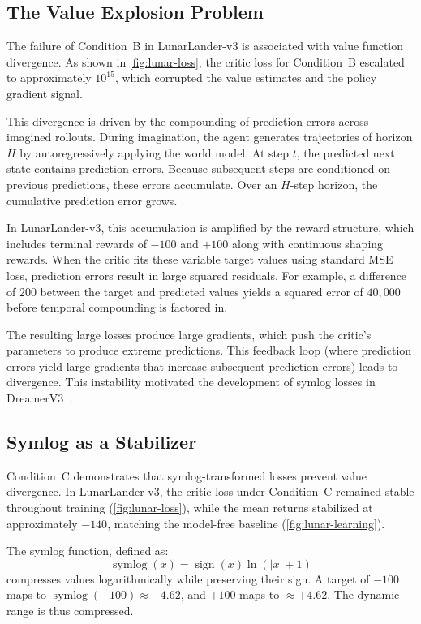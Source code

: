 \subsection{The Value Explosion Problem}

The failure of Condition~B in LunarLander-v3 is associated with value function divergence. As shown in \cref{fig:lunar-loss}, the critic loss for Condition~B escalated to approximately $10^{15}$, which corrupted the value estimates and the policy gradient signal.

This divergence is driven by the compounding of prediction errors across imagined rollouts. During imagination, the agent generates trajectories of horizon $H$ by autoregressively applying the world model. At step $t$, the predicted next state contains prediction errors. Because subsequent steps are conditioned on previous predictions, these errors accumulate. Over an $H$-step horizon, the cumulative prediction error grows.

In LunarLander-v3, this accumulation is amplified by the reward structure, which includes terminal rewards of $-100$ and $+100$ along with continuous shaping rewards. When the critic fits these variable target values using standard MSE loss, prediction errors result in large squared residuals. For example, a difference of $200$ between the target and predicted values yields a squared error of $40{,}000$ before temporal compounding is factored in.

The resulting large losses produce large gradients, which push the critic's parameters to produce extreme predictions. This feedback loop (where prediction errors yield large gradients that increase subsequent prediction errors) leads to divergence. This instability motivated the development of symlog losses in DreamerV3~\citep{hafner2023dreamerv3}.

\subsection{Symlog as a Stabilizer}

Condition~C demonstrates that symlog-transformed losses prevent value divergence. In LunarLander-v3, the critic loss under Condition~C remained stable throughout training (\cref{fig:lunar-loss}), while the mean returns stabilized at approximately $-140$, matching the model-free baseline (\cref{fig:lunar-learning}).

The symlog function, defined as:
\begin{equation}
    \operatorname{symlog}(x) = \operatorname{sign}(x) \ln(|x| + 1)
\end{equation}
compresses values logarithmically while preserving their sign. A target of $-100$ maps to $\operatorname{symlog}(-100) \approx -4.62$, and $+100$ maps to $\approx +4.62$. The dynamic range is thus compressed.

